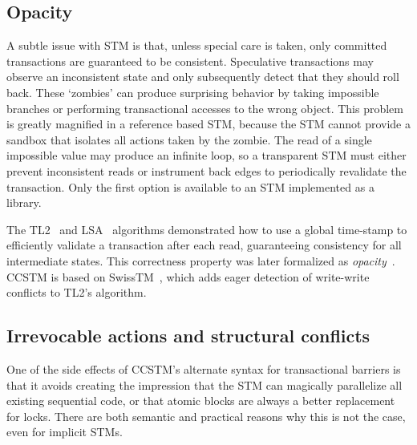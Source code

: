 \subsection{Opacity}

A subtle issue with STM is that, unless special care is taken, only
committed transactions are guaranteed to be consistent.  Speculative
transactions may observe an inconsistent state and only subsequently
detect that they should roll back.  These `zombies' can produce
surprising behavior by taking impossible branches or performing
transactional accesses to the wrong object.  This problem is greatly
magnified in a reference based STM, because the STM cannot provide a
sandbox that isolates all actions taken by the zombie.  The read of a
single impossible value may produce an infinite loop, so a transparent
STM must either prevent inconsistent reads or instrument back edges
to periodically revalidate the transaction.  Only the first option is
available to an STM implemented as a library.

The TL2~\cite{dice06tl2} and LSA~\cite{riegel06lsa} algorithms
demonstrated how to use a global time-stamp to efficiently validate
a transaction after each read, guaranteeing consistency for all
intermediate states.  This correctness property was later formalized
as \textit{opacity}~\cite{guerraoui08opacity}.  CCSTM is based on
SwissTM~\cite{dragojevic09swisstm}, which adds eager detection of
write-write conflicts to TL2's algorithm.

\subsection{Irrevocable actions and structural conflicts}

One of the side effects of CCSTM's alternate syntax for transactional barriers
is that it avoids creating the impression that the STM can magically
parallelize all existing sequential code, or that atomic blocks are
always a better replacement for locks.  There are both semantic and
practical reasons why this is not the case, even for implicit STMs.

